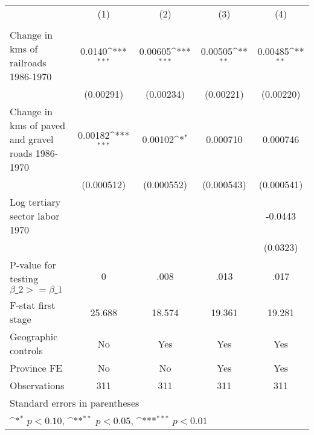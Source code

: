 {
\def\sym#1{\ifmmode^{#1}\else\(^{#1}\)\fi}
\begin{tabular}{l*{4}{c}}
\hline\hline
                &\multicolumn{1}{c}{(1)}&\multicolumn{1}{c}{(2)}&\multicolumn{1}{c}{(3)}&\multicolumn{1}{c}{(4)}\\
                &\multicolumn{1}{c}{}&\multicolumn{1}{c}{}&\multicolumn{1}{c}{}&\multicolumn{1}{c}{}\\
\hline
Change in kms of railroads 1986-1970&   0.0140\sym{***}&  0.00605\sym{***}&  0.00505\sym{**} &  0.00485\sym{**} \\
                &(0.00291)         &(0.00234)         &(0.00221)         &(0.00220)         \\
[1em]
Change in kms of paved and gravel roads 1986-1970&  0.00182\sym{***}&  0.00102\sym{*}  & 0.000710         & 0.000746         \\
                &(0.000512)         &(0.000552)         &(0.000543)         &(0.000541)         \\
[1em]
Log tertiary sector labor 1970&                  &                  &                  &  -0.0443         \\
                &                  &                  &                  & (0.0323)         \\
\hline
P-value for testing $\beta\_{2} >= \beta\_{1}$&        0         &     .008         &     .013         &     .017         \\
F-stat first stage&   25.688         &   18.574         &   19.361         &   19.281         \\
Geographic controls&       No         &      Yes         &      Yes         &      Yes         \\
Province FE     &       No         &       No         &      Yes         &      Yes         \\
Observations    &      311         &      311         &      311         &      311         \\
\hline\hline
\multicolumn{5}{l}{\footnotesize Standard errors in parentheses}\\
\multicolumn{5}{l}{\footnotesize \sym{*} \(p<0.10\), \sym{**} \(p<0.05\), \sym{***} \(p<0.01\)}\\
\end{tabular}
}

